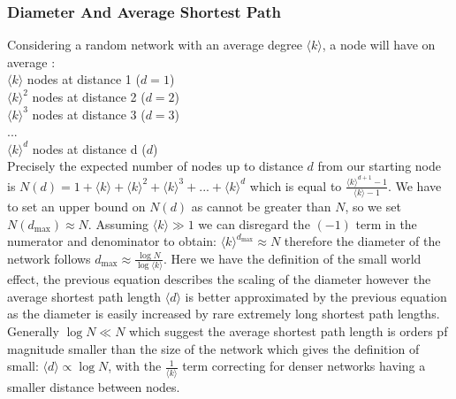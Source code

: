 \documentclass{article}
\begin{document}
            \subsubsection{Diameter And Average Shortest Path}
            Considering a random network with an average degree $\langle k \rangle$, a node will have on average \parencite{barabasi2013network}:\\
            $\langle k \rangle$ nodes at distance 1 ($d=1$)\\
            $\langle k \rangle^2$ nodes at distance 2 ($d=2$)\\
            $\langle k \rangle^3$ nodes at distance 3 ($d=3$)\\
            ...\\
            $\langle k \rangle^d$ nodes at distance d ($d$)\\
            Precisely the expected number of nodes up to distance $d$ from our starting node is $N(d) = 1+\langle k \rangle+\langle k \rangle^2+\langle k \rangle^3+...+\langle k \rangle^d$ which is equal to $\frac{\langle k \rangle^{d+1}-1}{\langle k \rangle -1}$. We have to set an upper bound on $N(d)$ as cannot be greater than $N$, so we set $N(d_{\text{max}}) \approx N$. Assuming $\langle k \rangle \gg 1$ we can disregard the $(-1)$ term in the numerator and denominator to obtain: $\langle k \rangle^{d_{\text{max}}} \approx N$ therefore the diameter of the network follows $d_{\text{max}} \approx \frac{\log{N}}{\log{\langle k \rangle}}$. Here we have the definition of the small world effect, the previous equation describes the scaling of the diameter however the average shortest path length $\langle d \rangle$ is better approximated by the previous equation as the diameter is easily increased by rare extremely long shortest path lengths. Generally $\log{N} \ll N$ which suggest the average shortest path length is orders pf magnitude smaller than the size of the network which gives the definition of small: $\langle d \rangle \propto \log{N}$, with the $\frac{1}{\langle k \rangle}$ term correcting for denser networks having a smaller distance between nodes.
\end{document}

